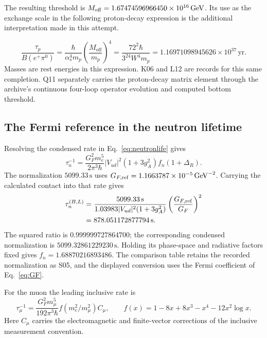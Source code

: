 \documentclass[aps,prx,onecolumn,10pt,notitlepage,nofootinbib,longbibliography]{revtex4-2}
\numberwithin{equation}{section}
\numberwithin{table}{section}
\newcommand{\GeV}{\,\mathrm{GeV}}
\begin{document}
The resulting threshold is $M_{\rm off}=1.67474596966450\times10^{16}\GeV$. Its use as the exchange scale in the following proton-decay expression is the additional interpretation made in this attempt.

\begin{equation}
 \frac{\tau_p}{B(e^+\pi^0)}
 =\frac{\hbar}{\alpha_s^4m_p}\left(\frac{M_{\mathrm{off}}}{m_p}\right)^4
 =\frac{72^2\hbar}{3^{24}W^4m_p}
 =1.16971098945626\times10^{37}\,\mathrm{yr}.
 \label{eq:protonlife}
\end{equation}
Masses are rest energies in this expression. K06 and L12 are records for this same completion. Q11 separately carries the proton-decay matrix element through the archive's continuous four-loop operator evolution and computed bottom threshold.

\subsection{The Fermi reference in the neutron lifetime}

Resolving the condensed rate in Eq.~\eqref{eq:neutronlife} gives
\begin{equation}
 \tau_n^{-1}=\frac{G_F^2m_e^5}{2\pi^3\hbar}
 |V_{ud}|^2(1+3g_A^2)f_n(1+\Delta_R).
 \label{eq:neutronrate}
\end{equation}
The normalization $5099.33\,\mathrm s$ uses
$G_{F,\rm ref}=1.1663787\times10^{-5}\GeV^{-2}$. Carrying the calculated
contact into that rate gives
\begin{align}
 \tau_n^{(B,L)}
 &=\frac{5099.33\,\mathrm s}
 {1.03983|V_{ud}|^2(1+3g_A^2)}
 \left(\frac{G_{F,\rm ref}}{G_F}\right)^2\notag\\
 &=878.051172877794\,\mathrm s.
 \label{eq:neutronlifenative}
\end{align}
The squared ratio is $0.999999727864700$; the corresponding condensed
normalization is $5099.32861229230\,\mathrm s$. Holding its phase-space and
radiative factors fixed gives $f_n=1.68870216893486$. The comparison table
retains the recorded normalization as S05, and the displayed conversion
uses the Fermi coefficient of Eq.~\eqref{eq:GF}.

For the muon the leading inclusive rate is
\begin{equation}
 \tau_\mu^{-1}=\frac{G_F^2m_\mu^5}{192\pi^3\hbar}
 f(m_e^2/m_\mu^2)C_\mu,\qquad
 f(x)=1-8x+8x^3-x^4-12x^2\log x.
 \label{eq:muondecay}
\end{equation}
Here $C_\mu$ carries the electromagnetic and finite-vector corrections of
the inclusive measurement convention.
\end{document}
